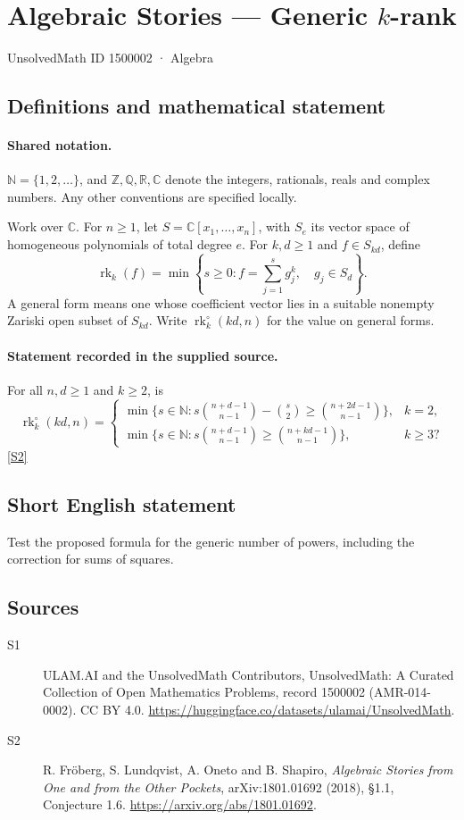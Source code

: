 \documentclass[11pt]{article}
\newcommand{\sref}[2]{\hyperlink{source:#1:#2}{[S#2]}}
\begin{document}
\setcounter{section}{1500001}
\section{Algebraic Stories — Generic $k$-rank}\label{1500002}
{\small\sffamily UnsolvedMath ID 1500002 · Algebra}
\subsection{Definitions and mathematical statement}

\paragraph{Shared notation.}$\mathbb N=\{1,2,\ldots\}$, and $\mathbb Z,\mathbb Q,\mathbb R,\mathbb C$ denote the integers, rationals, reals and complex numbers. Any other conventions are specified locally.


Work over $\mathbb C$. For $n\geq1$, let $S=\mathbb C[x_1,\ldots,x_n]$, with $S_e$ its vector space of homogeneous polynomials of total degree $e$. For $k,d\geq1$ and $f\in S_{kd}$, define
\[\operatorname{rk}_k(f)=\min\left\{s\geq0:f=\sum_{j=1}^{s}g_j^k,\quad g_j\in S_d\right\}.
\]
A general form means one whose coefficient vector lies in a suitable nonempty Zariski open subset of $S_{kd}$. Write $\operatorname{rk}_k^\circ(kd,n)$ for the value on general forms.
\paragraph{Statement recorded in the supplied source.}
For all $n,d\geq1$ and $k\geq2$, is
\[
\operatorname{rk}_k^\circ(kd,n)=
\begin{cases}
\min\{s\in\mathbb N:s\binom{n+d-1}{n-1}-\binom{s}{2}\geq\binom{n+2d-1}{n-1}\},&k=2,\\
\min\{s\in\mathbb N:s\binom{n+d-1}{n-1}\geq\binom{n+kd-1}{n-1}\},&k\geq3?
\end{cases}
\] \sref{1500002}{2}
\subsection{Short English statement}
Test the proposed formula for the generic number of powers, including the correction for sums of squares.
\subsection{Sources}
\begin{description}
\item[\hypertarget{source:1500002:1}{S1}] ULAM.AI and the UnsolvedMath Contributors, UnsolvedMath: A Curated Collection of Open Mathematics Problems, record 1500002 (AMR-014-0002). CC BY 4.0. \url{https://huggingface.co/datasets/ulamai/UnsolvedMath}.
\item[\hypertarget{source:1500002:2}{S2}] R. Fröberg, S. Lundqvist, A. Oneto and B. Shapiro, \emph{Algebraic Stories from One and from the Other Pockets}, arXiv:1801.01692 (2018), §1.1, Conjecture 1.6. \url{https://arxiv.org/abs/1801.01692}.
\end{description}
\label{end:1500002}
\end{document}
